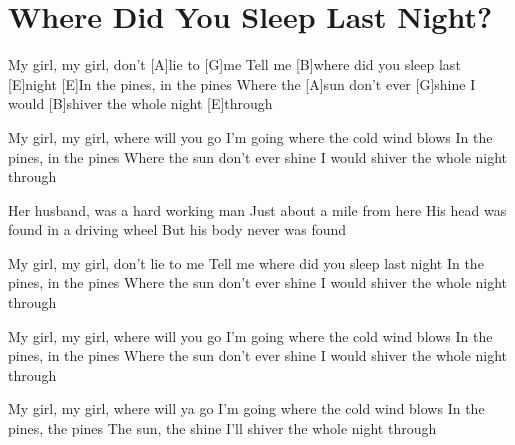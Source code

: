 \section{Where Did You Sleep Last Night?}
\begin{multicols}{2}
\begin{guitar}
   [E]My girl, my girl, don't [A]lie to [G]me
   Tell me [B]where did you sleep last [E]night
   [E]In the pines, in the pines
   Where the [A]sun don't ever [G]shine
   I would [B]shiver the whole night [E]through


   My girl, my girl, where will you go
   I'm going where the cold wind blows
   In the pines, in the pines
   Where the sun don't ever shine
   I would shiver the whole night through
   
   
   Her husband, was a hard working man
   Just about a mile from here
   His head was found in a driving wheel
   But his body never was found
   
   
   My girl, my girl, don't lie to me
   Tell me where did you sleep last night
   In the pines, in the pines
   Where the sun don't ever shine
   I would shiver the whole night through
   
   
   My girl, my girl, where will you go
   I'm going where the cold wind blows
   In the pines, in the pines
   Where the sun don't ever shine
   I would shiver the whole night through
    
   
   My girl, my girl, where will ya go
   I'm going where the cold wind blows
   In the pines, the pines
   The sun, the shine
   I'll shiver the whole night through   
\end{guitar}
\end{multicols}
